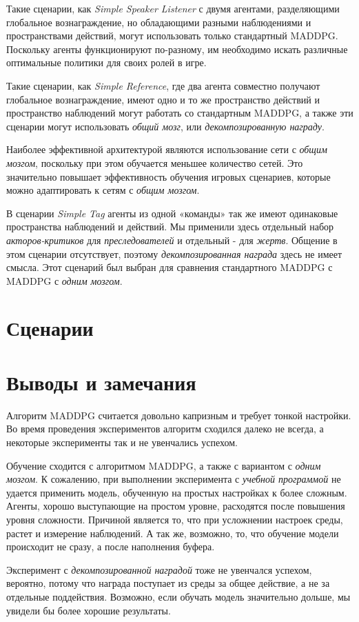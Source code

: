 Такие сценарии, как \textit{Simple Speaker Listener} с двумя агентами, разделяющими глобальное вознаграждение, но обладающими разными наблюдениями и пространствами действий, могут использовать только стандартный MADDPG. Поскольку агенты функционируют по-разному, им необходимо искать различные оптимальные политики для своих ролей в игре.

Такие сценарии, как \textit{Simple Reference}, где два агента совместно получают глобальное вознаграждение, имеют одно и то же пространство действий и пространство наблюдений могут работать со стандартным MADDPG, а также эти сценарии могут использовать \textit{общий мозг}, или \textit{декомпозированную награду}.

Наиболее эффективной архитектурой являются использование сети с \textit{общим мозгом}, поскольку при этом обучается меньшее количество сетей. Это значительно повышает эффективность обучения игровых сценариев, которые можно адаптировать к сетям с \textit{общим мозгом}.

В сценарии \textit{Simple Tag} агенты из одной «команды» так же имеют одинаковые пространства наблюдений и действий. Мы применили здесь отдельный набор \textit{акторов-критиков} для \textit{преследователей} и отдельный - для \textit{жертв}. Общение в этом сценарии отсутствует, поэтому \textit{декомпозированная награда} здесь не имеет смысла. Этот сценарий был выбран для сравнения стандартного MADDPG с MADDPG с \textit{одним мозгом}.

\newpage


\section{Сценарии}







\section{Выводы и замечания}

Алгоритм MADDPG считается довольно капризным и требует тонкой настройки. Во время проведения экспериментов алгоритм сходился далеко не всегда, а некоторые эксперименты так и не увенчались успехом.

Обучение сходится с алгоритмом MADDPG, а также с вариантом с \textit{одним мозгом}. К сожалению, при выполнении эксперимента с \textit{учебной программой} не удается применить модель, обученную на простых настройках к более сложным. Агенты, хорошо выступающие на простом уровне, расходятся после повышения уровня сложности. Причиной является то, что при усложнении настроек среды, растет и измерение наблюдений. А так же, возможно, то, что обучение модели происходит не сразу, а после наполнения буфера.

Эксперимент с \textit{декомпозированной наградой} тоже не увенчался успехом, вероятно, потому что награда поступает из среды за общее действие, а не за отдельные поддействия. Возможно, если обучать модель значительно дольше, мы увидели бы более хорошие результаты.


\newpage
